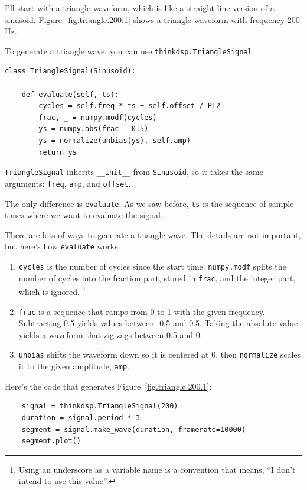 \documentclass[12pt]{book}
\begin{document}
I'll start with a triangle waveform, which is like a straight-line
version of a sinusoid.  Figure~\ref{fig.triangle.200.1} shows a
triangle waveform with frequency 200 Hz.

To generate a triangle wave, you can use {\tt thinkdsp.TriangleSignal}:

\begin{verbatim}
class TriangleSignal(Sinusoid):
    
    def evaluate(self, ts):
        cycles = self.freq * ts + self.offset / PI2
        frac, _ = numpy.modf(cycles)
        ys = numpy.abs(frac - 0.5)
        ys = normalize(unbias(ys), self.amp)
        return ys
\end{verbatim}

{\tt TriangleSignal} inherits \verb"__init__" from {\tt Sinusoid},
so it takes the same arguments: {\tt freq}, {\tt amp}, and {\tt offset}.

The only difference is {\tt evaluate}.  As we saw before,
{\tt ts} is the sequence of sample times where we want to
evaluate the signal.

There are lots of ways to generate a triangle wave.  The details
are not important, but here's how {\tt evaluate} works:

\begin{enumerate}

\item {\tt cycles} is the number of cycles since the start time.
{\tt numpy.modf} splits the number of cycles into the fraction
part, stored in {\tt frac}, and the integer part, which is ignored.
\footnote{Using an underscore as a variable name is a convention that
means, ``I don't intend to use this value''.}

\item {\tt frac} is a sequence that ramps from 0 to 1 with the given
  frequency.  Subtracting 0.5 yields values between -0.5 and 0.5.
  Taking the absolute value yields a waveform that zig-zags between
  0.5 and 0.

\item {\tt unbias} shifts the waveform down so it is centered at 0, then
{\tt normalize} scales it to the given amplitude, {\tt amp}.

\end{enumerate}

Here's the code that generates Figure~\ref{fig.triangle.200.1}:

\begin{verbatim}
    signal = thinkdsp.TriangleSignal(200)
    duration = signal.period * 3
    segment = signal.make_wave(duration, framerate=10000)
    segment.plot()
\end{verbatim}
\end{document}
